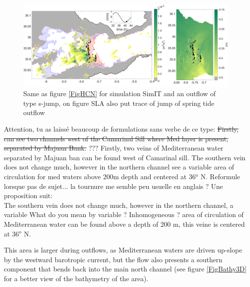 \begin{figure}[!h]
 \centering
\includegraphics[width=\linewidth]{./GBR3D/IES_41h_p.png}
 \caption {Same as figure  \ref{FigHCN} for simulation SimIT and an outflow of type {s-jump}, on figure SLA also put trace of jump of spring tide outflow}
 \label{FigHCI}
\end{figure}

\color{green}Attention, tu as laissé beaucoup de formulations sans verbe de ce type: 
\sout{Firstly, can see two channels west of the Camarinal Sill where Med layer is present, separated by Majuan Bank.} ???\color{black}
\color{blue}Firstly, two veins of Mediterranean water separated by Majuan ban can be found west of Camarinal sill.
The southern vein does not change much, however in the northern channel see a variable area of circulation for med waters above 200m depth and centered at 36$^\text{o}$ N. \color{green}Reformule lorsque pas de sujet... la tournure me semble peu usuelle en anglais ? Une proposition suit:\\
 \color{blue}
The southern vein does not change much, however in the northern channel, a variable  \color{green} What do you mean by variable ? Inhomogeneous ? \color{blue} area of circulation of Mediterranean water can be found above a depth of 200 m, this veine is centered at 36$^\text{o}$ N.  \color{black}

This area is larger during outflows, as Mediterranean waters are driven up-slope by the westward barotropic current, but \color{blue} the flow also presents a \color{black}  southern component that bends back into the main north channel (see figure \ref{FigBathy3D} for a better view of the bathymetry of the area).

